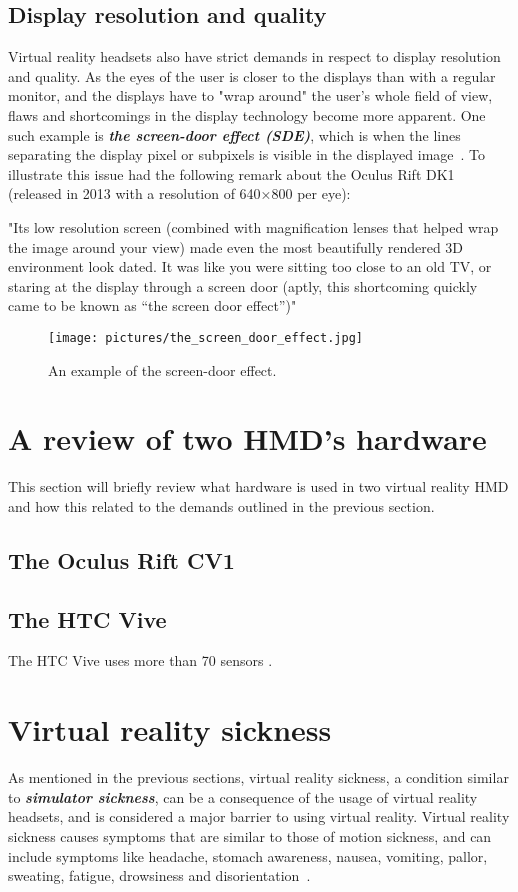 \subsection{Display resolution and quality}
Virtual reality headsets also have strict demands in respect to display resolution and quality. As the eyes of the user is closer
to the displays than with a regular monitor, and the displays have to "wrap around" the user's whole field of view, flaws and shortcomings in the display technology 
become more apparent. 
One such example is \textbf{\textit{the screen-door effect (SDE)}}, 
which is when the lines separating the display pixel or subpixels is visible in the displayed image~\citep{TC2016}. 
To illustrate this issue \citet{TC2016} had the following remark about the Oculus Rift DK1 (released in 2013 with a resolution of 640×800 per eye):

"Its low resolution screen (combined with magnification lenses that helped wrap the image around your view) made even the most beautifully rendered 3D environment look dated. 
It was like you were sitting too close to an old TV, or staring at the display through a screen door (aptly, this shortcoming quickly came to be known as “the screen door effect”)"

\begin{figure}%
	\texttt{[image: pictures/the\_screen\_door\_effect.jpg]}
	\caption[The screen-door effect]{An example of the screen-door effect.}
	\label{fig:the_screen_door_effect}
\end{figure} 

\section{A review of two HMD's hardware}
This section will briefly review what hardware is used in two virtual reality HMD and how this related to the demands outlined in the previous section. 
\subsection{The Oculus Rift CV1}

\subsection{The HTC Vive}
The HTC Vive uses more than 70 sensors \citep{BBC2015}.


\section{Virtual reality sickness}
As mentioned in the previous sections, virtual reality sickness, a condition similar to \textbf{\textit{simulator sickness}}, 
can be a consequence of the usage of virtual reality headsets, and is considered a major barrier to 
using virtual reality. Virtual reality sickness causes symptoms that are similar to those of motion sickness, and can include symptoms like 
headache, stomach awareness, nausea, vomiting, pallor, sweating, fatigue, drowsiness and disorientation~\citep{Kolasinski1995}. 

